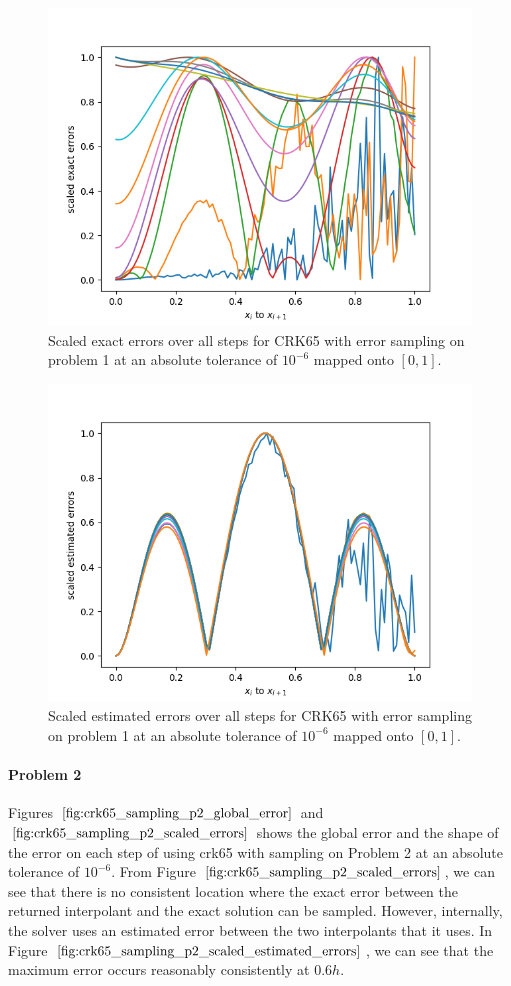 \begin{figure}[H]
\centering
\includegraphics[width=0.7\linewidth]{./figures/crk65_sampling_p1_scaled_errors}
\caption{Scaled exact errors over all steps for CRK65 with error sampling on problem 1 at an absolute tolerance of $10^{-6}$ mapped onto $[0, 1]$.}
\label{fig:crk65_sampling_p1_scaled_errors}
\end{figure}

\begin{figure}[H]
\centering
\includegraphics[width=0.7\linewidth]{./figures/crk65_sampling_p1_scaled_estimated_errors}
\caption{Scaled estimated errors over all steps for CRK65 with error sampling on problem 1 at an absolute tolerance of $10^{-6}$ mapped onto $[0, 1]$.}
\label{fig:crk65_sampling_p1_scaled_estimated_errors}
\end{figure}


\paragraph{Problem 2} Figures $\ref{fig:crk65_sampling_p2_global_error}$ and $\ref{fig:crk65_sampling_p2_scaled_errors}$ shows the global error and the shape of the error on each step of using crk65 with sampling on Problem 2 at an absolute tolerance of $10^{-6}$. From Figure $\ref{fig:crk65_sampling_p2_scaled_errors}$, we can see that there is no consistent location where the exact error between the returned interpolant and the exact solution can be sampled. However, internally, the solver uses an estimated error between the two interpolants that it uses. In Figure $\ref{fig:crk65_sampling_p2_scaled_estimated_errors}$, we can see that the maximum error occurs reasonably consistently at $0.6h$.

